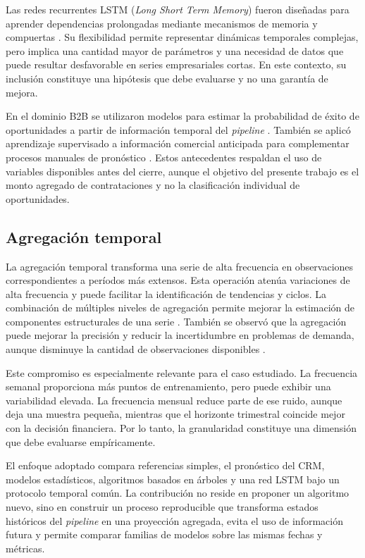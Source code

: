 Las redes recurrentes LSTM (\textit{Long Short Term Memory}) fueron diseñadas para aprender dependencias prolongadas mediante mecanismos de memoria y compuertas \citep{HochreiterSchmidhuber1997}. Su flexibilidad permite representar dinámicas temporales complejas, pero implica una cantidad mayor de parámetros y una necesidad de datos que puede resultar desfavorable en series empresariales cortas. En este contexto, su inclusión constituye una hipótesis que debe evaluarse y no una garantía de mejora.

En el dominio B2B se utilizaron modelos para estimar la probabilidad de éxito de oportunidades a partir de información temporal del \textit{pipeline} \citep{Yan2015}. También se aplicó aprendizaje supervisado a información comercial anticipada para complementar procesos manuales de pronóstico \citep{Rohaan2022}. Estos antecedentes respaldan el uso de variables disponibles antes del cierre, aunque el objetivo del presente trabajo es el monto agregado de contrataciones y no la clasificación individual de oportunidades.

\subsection{Agregación temporal}

La agregación temporal transforma una serie de alta frecuencia en observaciones correspondientes a períodos más extensos. Esta operación atenúa variaciones de alta frecuencia y puede facilitar la identificación de tendencias y ciclos. La combinación de múltiples niveles de agregación permite mejorar la estimación de componentes estructurales de una serie \citep{Kourentzes2014}. También se observó que la agregación puede mejorar la precisión y reducir la incertidumbre en problemas de demanda, aunque disminuye la cantidad de observaciones disponibles \citep{Kourentzes2017}.

Este compromiso es especialmente relevante para el caso estudiado. La frecuencia semanal proporciona más puntos de entrenamiento, pero puede exhibir una variabilidad elevada. La frecuencia mensual reduce parte de ese ruido, aunque deja una muestra pequeña, mientras que el horizonte trimestral coincide mejor con la decisión financiera. Por lo tanto, la granularidad constituye una dimensión que debe evaluarse empíricamente.

El enfoque adoptado compara referencias simples, el pronóstico del CRM, modelos estadísticos, algoritmos basados en árboles y una red LSTM bajo un protocolo temporal común. La contribución no reside en proponer un algoritmo nuevo, sino en construir un proceso reproducible que transforma estados históricos del \textit{pipeline} en una proyección agregada, evita el uso de información futura y permite comparar familias de modelos sobre las mismas fechas y métricas.

